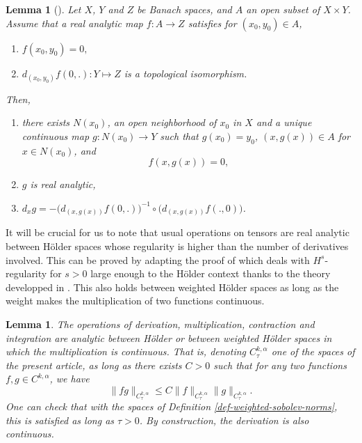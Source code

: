 \documentclass[a4paper,11pt,reqno]{amsart}
\newtheorem{lemma}[defn]{Lemma}
\numberwithin{equation}{section}
\begin{document}
	\begin{lemma}[{\cite[Implicit Function Theorem, p. 1081]{Whi-Ana-Fct}}]\label{th fcts implicites}
		Let $X$, $Y$ and $Z$ be Banach spaces, and $A$ an open subset of $X\times Y$. Assume that a real analytic map $f : A\to Z$ satisfies for $(x_0,y_0)\in A$,
		\begin{enumerate}
			\item $f(x_0,y_0)=0,$
			\item $d_{(x_0,y_0)}f(0,.) : Y\mapsto Z$ is a topological isomorphism.
		\end{enumerate}
		Then,
		\begin{enumerate}
			\item there exists $N(x_0)$, an open neighborhood of $x_0$ in $X$ and a unique continuous map $g : N(x_0)\to Y$ such that $g(x_0)= y_0$, $(x,g(x))\in A$ for $x\in N(x_0)$, and
			$$f(x,g(x))=0,$$
			\item $g$ is real analytic,
			\item $d_xg = -\big(d_{(x,g(x))}f(0,.)\big)^{-1}\circ \big(d_{(x,g(x))} f (.,0)\big)$.
		\end{enumerate}
	\end{lemma}
	
	It will be crucial for us to note that usual operations on tensors are real analytic between H\"older spaces whose regularity is higher than the number of derivatives involved. This can be proved by adapting the proof of \cite[Lemma 13.7]{Koi-Ein-Met} which deals with $H^s$-regularity for $s>0$ large enough to the H\"older context thanks to the theory developped in \cite{Pal-Found}. This also holds between weighted H\"older spaces as long as the weight makes the multiplication of two functions continuous.
	
	\begin{lemma}\label{opérations analytiques}
		The operations of derivation, multiplication, contraction and integration are analytic between Hölder or between weighted Hölder spaces in which the multiplication is continuous. That is, denoting $C_\tau^{k,\alpha}$ one of the spaces of the present article, as long as there exists $C>0$ such that for any two functions $f,g\in C^{k,\alpha}$, we have
		$$\|fg\|_{C_\tau^{k,\alpha}}\leq C\|f\|_{C_\tau^{k,\alpha}}\|g\|_{C_\tau^{k,\alpha}}.$$
		One can check that with the spaces of Definition \ref{def-weighted-sobolev-norms}, this is satisfied as long as $\tau>0$. By construction, the derivation is also continuous.
	\end{lemma}
	
\end{document}
